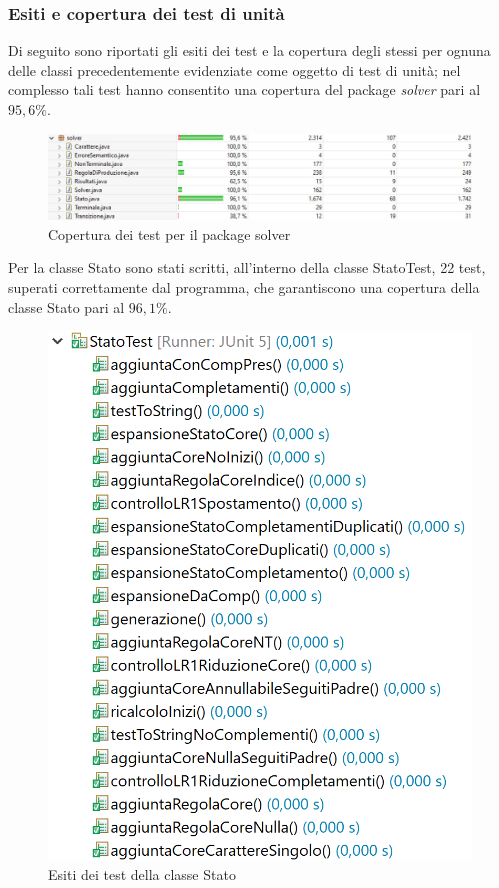 \documentclass[12pt]{article}
\newcounter{subsubsubsection}[subsubsection]
\begin{document}
\subsubsection{Esiti e copertura dei test di unità}
Di seguito sono riportati gli esiti dei test e la copertura degli stessi per ognuna delle classi precedentemente evidenziate come oggetto di test di unità; nel complesso tali test hanno consentito una copertura del package \textit{solver} pari al $95,6\%$.
\begin{figure}[h]
\centering
\includegraphics[width=\textwidth]{immagini/SolverCoverage.png}
\caption{Copertura dei test per il package solver}
\end{figure}
Per la classe Stato sono stati scritti, all'interno della classe StatoTest, 22 test, superati correttamente dal programma, che garantiscono una copertura della classe Stato pari al $96,1\%$.
\begin{figure}[H]
\centering
\includegraphics[scale=0.4]{immagini/esitiStatoTest.png}
\caption{Esiti dei test della classe Stato}
\end{figure}
\end{document}
